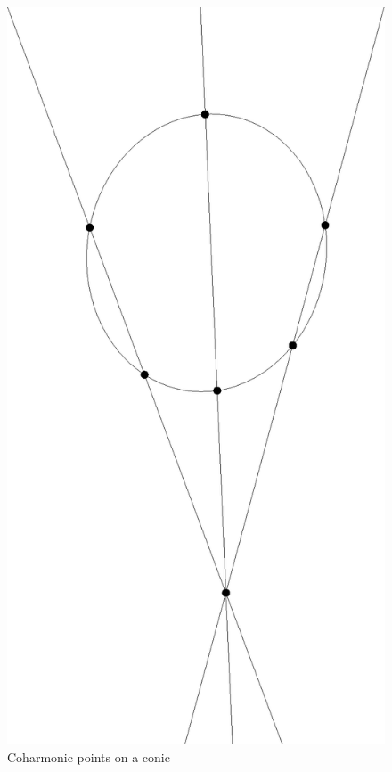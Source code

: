 \begin{figure}[!htb]
\centering
\includegraphics[scale=0.3,angle=270]{coharmonic.eps}
\caption{Coharmonic points on a conic}\label{coharmonic-conic}
\end{figure}


